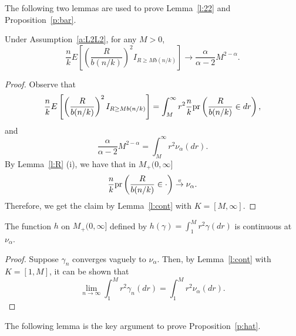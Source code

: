 \documentclass[lineno]{biometrika}
\newcommand \ag{\alpha}
\newcommand \ga{\gamma}
\newcommand\lp{\left (}
\newcommand\rp{\right )}
\newcommand\lb{\left [}
\newcommand\rb{\right ]}
\def\convv{\stackrel{\mbox{$\scriptstyle v$}}{\rightarrow}}
\begin{document}
The following two lemmas are used to prove Lemma~\ref{l:22} and Proposition~\ref{p:bar}.




\begin{lemma} \label{l:alM}
Under Assumption~\ref{a:L2L2}, for any $M>0$,
\[
\frac{n}{k} E \lb \lp \frac{R}{b(n/k)} \rp^2 I_{R \ge Mb(n/k) }  \rb  \to \frac{\ag}{\ag-2}M^{2-\ag}.
\]
\end{lemma}

\begin{proof}


Observe that
\[
\frac{n}{k} E \lb \lp \frac{R}{b(n/k)} \rp^2 I_{R \ge Mb(n/k) }  \rb
=\int_M^{\infty} r^2  \frac{n}{k}{\rm pr}\lp \frac{R}{b(n/k)} \in dr\rp,
\]
and
\[
\frac{\ag}{\ag-2}M^{2-\ag} = \int_{M}^{\infty} r^2 \nu_{\ag}(dr).
\]
By Lemma~\ref{l:R} (i), we have that in $M_+(0,\infty]$
\[
\frac{n}{k}{\rm pr}\lp \frac{R}{b(n/k)} \in \cdot \rp \convv \nu_{\ag}.
\]
Therefore, we get the claim by Lemma~\ref{l:cont} with $K= [M, \infty]$.
\end{proof}



\begin{lemma} \label{l:cont-2}
The function $h$ on $M_+(0,\infty]$ defined by $h(\ga) = \int_1^M r^2 \ga(dr)$ is continuous at $\nu_\ag$.
\end{lemma}
\begin{proof}
Suppose $\ga_n$ converges vaguely to $\nu_\ag$. Then, by Lemma~\ref{l:cont} with $K= [1, M]$, it can be shown that
\[
\lim_{n\to\infty} \int_1^M r^2 \ga_n(dr) = \int_1^M r^2 \nu_\ag(dr).
\]
\end{proof}


The following lemma is the key argument to prove Proposition~\ref{p:hat}.
\end{document}
